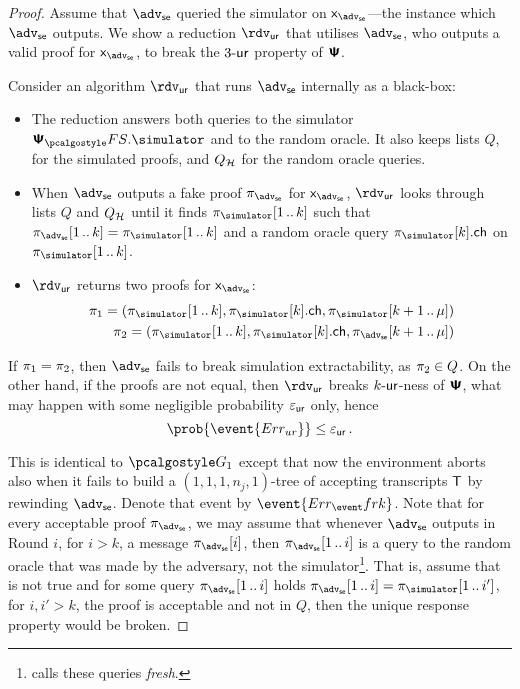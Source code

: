 \let\accentvec\vec \documentclass[runningheads,10pt]{llncs}
\begin{document}
\begin{proof}
	Assume that $\advse$ queried the simulator on $\inp_{\advse}$---the instance which $\advse$ outputs. 
	We show a reduction $\rdvur$ that utilises $\advse$, who outputs a valid proof for $\inp_\advse$, to break the ${3\text{-}\mathsf{ur}}$ property of $\bm{\mathsf{\Psi}}$. 

	Consider an algorithm $\rdvur$ that runs $\advse$ internally as a black-box:
	\begin{itemize}
		\item The reduction answers both queries to the simulator $\psfs.\simulator$ and to the random oracle. 
		It also keeps lists $Q$, for the simulated proofs, and $Q_{\mathcal{H}}$ for the random oracle queries. 
		\item When $\advse$ outputs a fake proof $\zkproof_{\advse}$ for  $\inp_\advse$, $\rdvur$ looks through lists $Q$ and $Q_{\mathcal{H}}$ until it finds 
		$\zkproof_{\simulator}\range{1}{k}$ such that $\zkproof_{\advse}\range{1}{k} = \zkproof_{\simulator}\range{1}{k}$ and a random oracle query $\zkproof_{\simulator}[k].\ch$ on $\zkproof_{\simulator}\range{1}{k}$.
		\item $\rdvur$ returns two proofs for $\inp_\advse$:
		\begin{align*}
			\zkproof_1 = (\zkproof_{\simulator}\range{1}{k}, \zkproof_{\simulator}[k].\ch, \zkproof_{\simulator}\range{k + 1}{\mu})\\
			\zkproof_2 = (\zkproof_{\simulator}\range{1}{k}, \zkproof_{\simulator}[k].\ch, \zkproof_{\advse}\range{k + 1}{\mu})
		\end{align*}
		\end{itemize}  
		If $\pi_1 = \pi_2$, then $\advse$ fails to break simulation extractability, as $\pi_2 \in Q$.
		On the other hand, if the proofs are not equal, then $\rdvur$ breaks ${k\text{-}\mathsf{ur}}$-ness of $\bm{\mathsf{\Psi}}$, what may happen with some negligible probability $\varepsilon_{\mathsf{ur}}$ only, hence
		\[
			\prob{\event{\errur}} \leq \epsur\,.
		\]
		
	This is identical to $\game{1}$ except that now the environment aborts also when it fails to build a $(1, 1, 1, n_j, 1)$-tree of accepting transcripts $\mathsf{T}$ by rewinding $\advse$. Denote that event 
	by $\event{\errfrk}$.
	Note that for every acceptable proof $\zkproof_{\advse}$, we may
	assume that whenever $\advse$ outputs in Round $i$, for $i > k$, a message $\zkproof_{\advse}[i]$, then
	$\zkproof_{\advse}\range{1}{i}$ is a query to the random oracle that was made by the adversary, not the simulator\footnote{\cite{INDOCRYPT:FKMV12} calls these queries \emph{fresh}.}. 
	That is, assume that is not true and for some query $\zkproof_{\advse}\range{1}{i}$ holds $\zkproof_{\advse}\range{1}{i} = \zkproof_\simulator\range{1}{i'}$, for $i, i' > k$, the proof is acceptable and not in $Q$, then the unique response property would be broken.
	

\end{proof}
\end{document}
